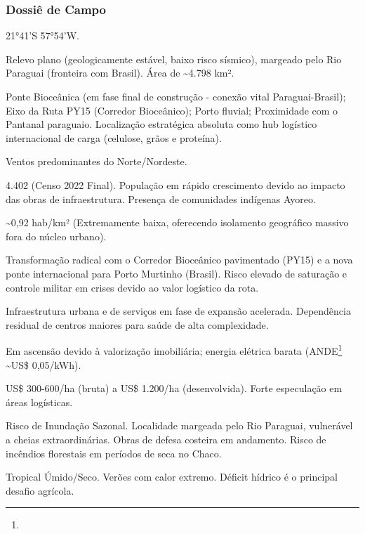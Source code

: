 \subsubsection{Dossiê de Campo}
\begin{description}[style=nextline,leftmargin=0.5cm,font=\bfseries]
\item[Coordenadas]  21°41'S 57°54'W.
\item[Topografia]  Relevo plano (geologicamente estável, baixo risco sísmico), margeado pelo Rio Paraguai (fronteira com Brasil). Área de \textasciitilde 4.798 km².
\item[Alvos Estratégicos]  Ponte Bioceânica (em fase final de construção - conexão vital Paraguai-Brasil); Eixo da Ruta PY15 (Corredor Bioceânico); Porto fluvial; Proximidade com o Pantanal paraguaio. Localização estratégica absoluta como hub logístico internacional de carga (celulose, grãos e proteína).
\item[Fallout]  Ventos predominantes do Norte/\allowbreak Nordeste.
\item[População]  4.402 (Censo 2022 Final). População em rápido crescimento devido ao impacto das obras de infraestrutura. Presença de comunidades indígenas Ayoreo.
\item[Densidade]  \textasciitilde 0,92 hab/\allowbreak km² (Extremamente baixa, oferecendo isolamento geográfico massivo fora do núcleo urbano).
\item[Vias de Acesso]  Transformação radical com o Corredor Bioceânico pavimentado (PY15) e a nova ponte internacional para Porto Murtinho (Brasil). Risco elevado de saturação e controle militar em crises devido ao valor logístico da rota.
\item[Serviços]  Infraestrutura urbana e de serviços em fase de expansão acelerada. Dependência residual de centros maiores para saúde de alta complexidade.
\item[Custo de Vida]  Em ascensão devido à valorização imobiliária; energia elétrica barata (ANDE\footnote{\fineANDE} \textasciitilde US\$ 0,05/\allowbreak kWh).
\item[Preço da Terra]  US\$ 300-600/\allowbreak ha (bruta) a US\$ 1.200/\allowbreak ha (desenvolvida). Forte especulação em áreas logísticas.
\item[Hidrologia]  Risco de Inundação Sazonal. Localidade margeada pelo Rio Paraguai, vulnerável a cheias extraordinárias. Obras de defesa costeira em andamento. Risco de incêndios florestais em períodos de seca no Chaco.
\item[Clima]  Tropical Úmido/\allowbreak Seco. Verões com calor extremo. Déficit hídrico é o principal desafio agrícola.

\end{description}
